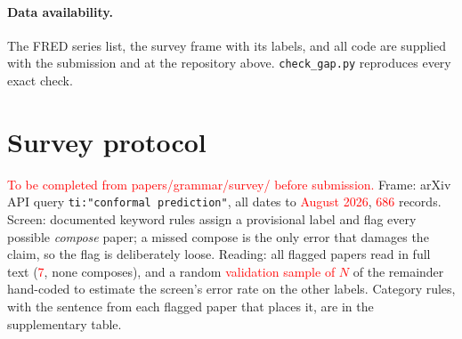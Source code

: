 \documentclass[11pt]{article}
\theoremstyle{definition}
\newcommand{\prov}[1]{\textcolor{red}{#1}}
\newif\ifanon
\begin{document}
\paragraph{Data availability.} The FRED series list, the survey frame with its labels, and
all code are supplied with the submission\ifanon\else{} and at the repository above\fi.
\texttt{check\_gap.py} reproduces every exact check.

\appendix
\section{Survey protocol}\label{app:survey}

\prov{To be completed from papers/grammar/survey/ before submission.} Frame: arXiv API query
\texttt{ti:"conformal prediction"}, all dates to \prov{August 2026}, \prov{686} records.
Screen: documented keyword rules assign a provisional label and flag every possible
\emph{compose} paper; a missed compose is the only error that damages the claim, so the flag is
deliberately loose. Reading: all flagged papers read in full text (\prov{7}, none composes), and
a random \prov{validation sample of $N$} of the remainder hand-coded to estimate the screen's
error rate on the other labels. Category rules, with the sentence from each flagged paper that
places it, are in the supplementary table.



\end{document}
